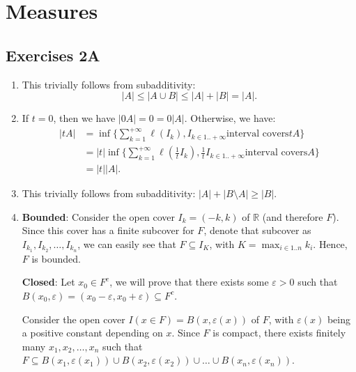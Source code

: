 \chapter{Measures} %
\label{chap:Measures}

\section{Exercises 2A} %
\label{sec:Exercises 2A}

\begin{enumerate}[label=\textbf{2A.\arabic*}]
  \item \label{2A1}
    This trivially follows from subadditivity:
    \[
      |A| \le |A \cup B| \le |A| + |B| = |A|
    .\] 
  \item If \( t = 0 \), then we have \( |0A| = 0 = 0 |A| \). Otherwise, we have:
    \begin{align*}
      |tA| &= \inf \{\sum_{k = 1}^{+\infty} \ell(I_{k}), I_{k \in
      1..+\infty} \text{interval covers} tA\}  \\
           &= |t|\inf \{\sum_{k = 1}^{+\infty} \ell\left( \frac{1}{t} I_{k} \right) , \frac{1}{t}I_{k \in 1..+\infty} \text{interval covers} A\}  \\
           &= |t| |A|
    .\end{align*}
  \item This trivially follows from subadditivity: \( |A| + |B \setminus A| \ge
    |B|\).
  \item \textbf{Bounded}: Consider the open cover \( I_{k} = (-k, k) \) of \( \mathbb{R} \) (and
    therefore \( F \)). Since this cover has a finite subcover for \( F \),
    denote that subcover as \( I_{k_{1}}, I_{k_{2}}, \ldots , I_{k_{n}} \), we
    can easily see that \( F \subseteq I_{K}\), with \( K = \max_{i \in 1..n}
    k_{i} \). Hence, \( F \) is bounded.

    \textbf{Closed}: Let \( x_{0} \in F^{c} \), we will prove that there exists
    some \( \varepsilon > 0 \) such that \( B(x_{0}, \varepsilon) = (x_{0} -
    \varepsilon, x_{0} + \varepsilon) \subseteq F^{c} \).

    Consider the open cover \( I(x \in F) = B(x, \varepsilon(x)) \) of \( F \),
    with \( \varepsilon(x) \) being a positive constant depending on \( x \).
    Since \( F \) is compact, there exists finitely many \( x_{1}, x_{2}, \ldots
    , x_{n}\) such that \( F \subseteq B(x_{1}, \varepsilon(x_{1})) \cup B(x_{2},
    \varepsilon(x_{2})) \cup  \ldots  \cup B(x_{n}, \varepsilon(x_{n})) \).


\end{enumerate}
